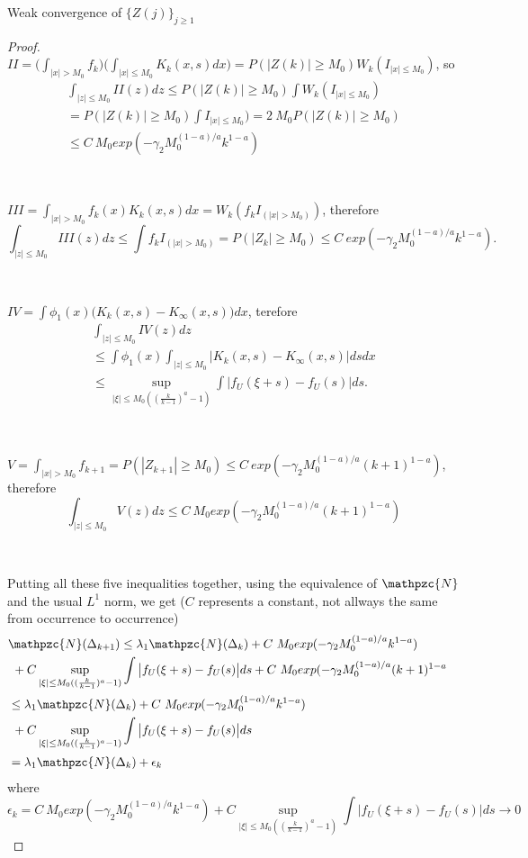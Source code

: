 \documentclass[12pt]{article}
\begin{document}
\begin{section}{Weak convergence of $\{Z(j)\}_{j \ge 1}$ }
\begin{proof}
$II = \big( \int_{|x| > M_0} f_{k} \big) \big( \int_{|x| \le M_0} K_k(x,s) dx \big) = P(|Z(k)| \ge M_0) W_k( I_{|x| \le M_0})$, so 
\begin{align*}
&\int_{|z| \le M_0} II(z) dz \le P(|Z(k)| \ge M_0) \int W_k( I_{|x| \le M_0}) &\\
&= P(|Z(k)| \ge M_0) \int I_{|x| \le M_0}) = 2\ M_0 P(|Z(k)| \ge M_0) &\\
&\le C\ M_0 exp( - \gamma_2 M_0^{(1-a)/a} k^{1-a} ) &
\end{align*}  

\  

$III = \int_{|x| > M_0} f_k(x)  K_k(x,s) dx = W_k( f_k I_{(|x| > M_0) } )$, therefore
$$
\int_{|z| \le M_0} III(z) dz \le \int  f_k I_{(|x| > M_0)} = P(|Z_k| \ge M_0) 
\le C\ exp( - \gamma_2 M_0^{(1-a)/a} k^{1-a} ).
$$  

\  

$IV = \int \phi_1(x) \big( K_k(x,s) - K_{\infty}(x,s) \big) dx $, terefore
\begin{align*}
&\int_{|z| \le M_0} IV(z) dz  &\\
&\le  \int \phi_1(x) \int_{|z| \le M_0} \big| K_k(x,s) - K_{\infty}(x,s) \big| ds dx &\\
&\le \sup_{|\xi| \le M_0 ( (\frac{k}{k-1})^a -1)} 
\int \big| f_U(\xi+s) - f_U(s) \big| ds. &
\end{align*}  

\  

$V = \int_{|x| > M_0} f_{k+1} = P(|Z_{k+1}| \ge M_0) 
\le C\ exp( - \gamma_2 M_0^{(1-a)/a} (k+1)^{1-a} )$, therefore
$$
\int_{|z| \le M_0} V(z) dz \le C\ M_0 exp( - \gamma_2 M_0^{(1-a)/a} (k+1)^{1-a} )
$$  

\  

Putting all these five inequalities together, using the equivalence of $\mathpzc{N}$ and the usual $L^1$ norm, we get ($C$ represents a constant, not allways the same from occurrence to occurrence)
$$
\begin{aligned}
&\mathpzc{N}(\Delta_{k+1}) \le \lambda_1 \mathpzc{N}(\Delta_k) + C\ M_0 exp( - \gamma_2 M_0^{(1-a)/a} k^{1-a} ) &\\
&\  + C \sup_{|\xi| \le M_0 ( (\frac{k}{k-1})^a -1)} \int \big| f_U(\xi+s) - f_U(s) \big| ds  
+ C\ M_0 exp( - \gamma_2 M_0^{(1-a)/a} (k+1)^{1-a} &\\
& \le \lambda_1 \mathpzc{N}(\Delta_k) + C\ M_0 exp( - \gamma_2 M_0^{(1-a)/a} k^{1-a} ) &\\
&\  + C \sup_{|\xi| \le M_0 ( (\frac{k}{k-1})^a -1)} \int \big| f_U(\xi+s) - f_U(s) \big| ds  &\\
& = \lambda_1 \mathpzc{N}(\Delta_k) + \epsilon_k &
\end{aligned}  
$$  
where 
$$\epsilon_k = C\ M_0 exp( - \gamma_2 M_0^{(1-a)/a} k^{1-a} )
  + C \sup_{|\xi| \le M_0 ( (\frac{k}{k-1})^a -1)} \int \big| f_U(\xi+s) - f_U(s) \big| ds \rightarrow 0
 $$  


\end{proof}
\end{section}
\end{document}
